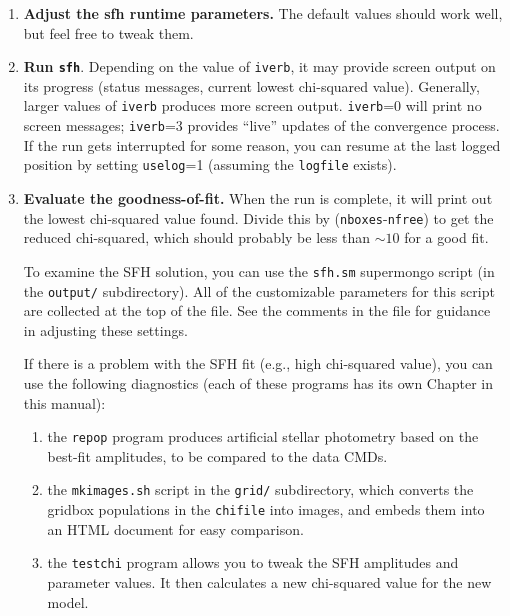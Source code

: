 \documentclass[12pt]{book}
\def\ttg{\tt\color{DarkGreen}}
\def\tto{\tt\color{myOrange}}
\begin{document}
\begin{enumerate}
\item {\bf Adjust the sfh runtime parameters.}  The default values 
should work well, but feel free to tweak them.

\item {\bf Run {\ttg sfh}}.  Depending on the value of {\tto iverb}, 
it may provide screen output on its progress (status messages, 
current lowest chi-squared value).  Generally, larger values of 
{\tto iverb} produces more screen output.  {\tto iverb}=0 will
print no screen messages; {\tto iverb}=3 provides ``live'' updates
of the convergence process.  If the run gets interrupted for 
some reason, you can resume at the last logged position by setting 
{\tto uselog}=1 (assuming the {\tto logfile} exists).

\item {\bf Evaluate the goodness-of-fit.}  When the run is complete, 
it will print out the lowest chi-squared value found.  Divide this by 
({\tto nboxes}-{\tto nfree}) to get the reduced chi-squared, which 
should probably be less than $\sim10$ for a good fit.  

To examine the SFH solution, you can use the {\ttg sfh.sm} supermongo 
script (in the {\ttg output/} subdirectory).  All of the customizable
parameters for this script are collected at the top of the file.  See
the comments in the file for guidance in adjusting these settings.

If there is a problem with the SFH fit (e.g., high chi-squared value), 
you can use the following diagnostics (each of these programs has its 
own Chapter in this manual):

\begin{enumerate}
\item the {\ttg repop} program produces artificial stellar photometry 
based on the best-fit amplitudes, to be compared to the data CMDs. 

\item the {\ttg mkimages.sh} script in the {\ttg grid/} subdirectory, 
which converts the gridbox populations in the {\tto chifile} into 
images, and embeds them into an HTML document for easy comparison.  

\item the {\ttg testchi} program allows you to tweak the SFH 
amplitudes and parameter values.  It then calculates a new chi-squared 
value for the new model.
\end{enumerate}

\end{enumerate}
\end{document}
